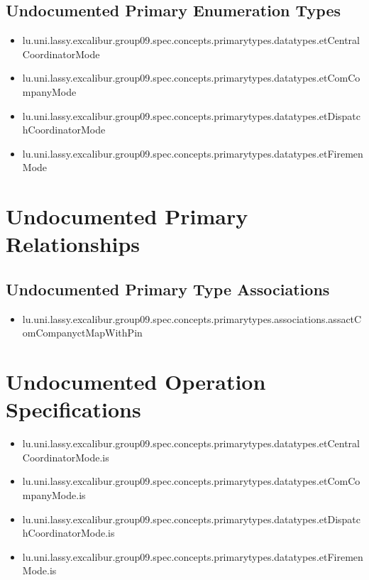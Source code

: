 \subsection[Undocumented Primary Enumeration Types]{Undocumented Primary Enumeration Types}
\begin{itemize}
\item lu.uni.lassy.excalibur.group09.spec.concepts.primarytypes.datatypes.etCentralCoordinatorMode 
\item lu.uni.lassy.excalibur.group09.spec.concepts.primarytypes.datatypes.etComCompanyMode 
\item lu.uni.lassy.excalibur.group09.spec.concepts.primarytypes.datatypes.etDispatchCoordinatorMode 
\item lu.uni.lassy.excalibur.group09.spec.concepts.primarytypes.datatypes.etFiremenMode 
\end{itemize}






\section[Undocumented Primary Type Relationships]{Undocumented Primary Relationships}

\subsection[Undocumented Primary Type Associations]{Undocumented Primary Type Associations}
\begin{itemize}
\item lu.uni.lassy.excalibur.group09.spec.concepts.primarytypes.associations.assactComCompanyctMapWithPin 
\end{itemize}














\section[Undocumented Operation Specifications]{Undocumented Operation Specifications}
\begin{itemize}
\item lu.uni.lassy.excalibur.group09.spec.concepts.primarytypes.datatypes.etCentralCoordinatorMode.is 
\item lu.uni.lassy.excalibur.group09.spec.concepts.primarytypes.datatypes.etComCompanyMode.is 
\item lu.uni.lassy.excalibur.group09.spec.concepts.primarytypes.datatypes.etDispatchCoordinatorMode.is 
\item lu.uni.lassy.excalibur.group09.spec.concepts.primarytypes.datatypes.etFiremenMode.is 
\end{itemize}








